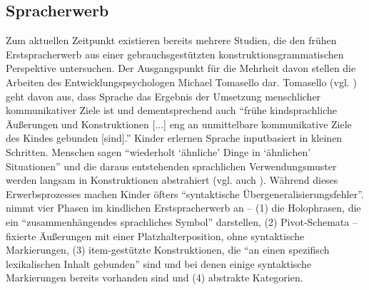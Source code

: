


\subsection{Spracherwerb}
Zum aktuellen Zeitpunkt existieren bereits mehrere Studien, die den frühen Erstspracherwerb aus einer gebrauchsgestützten konstruktionsgrammatischen Perspektive untersuchen.
Der Ausgangspunkt für die Mehrheit davon stellen die Arbeiten des Entwicklungspsychologen Michael Tomasello dar.
Tomasello (vgl. \cite{Tomasello06}) geht davon aus, dass Sprache das Ergebnis der Umsetzung menschlicher kommunikativer Ziele ist
und dementsprechend auch ``frühe kindsprachliche Äußerungen und Konstruktionen [...] eng an unmittelbare kommunikative Ziele des Kindes gebunden [sind].''
Kinder erlernen Sprache inputbasiert in kleinen Schritten.
Menschen sagen ``wiederholt `ähnliche' Dinge in `ähnlichen' Situationen'' \cite{Tomasello06} und die daraus entstehenden sprachlichen Verwendungsmuster werden langsam in Konstruktionen abstrahiert (vgl. auch \cite{Ellis08}).
Während dieses Erwerbsprozesses machen Kinder öfters ``syntaktische Übergeneralisierungsfehler''.%
\cite{Tomasello06} nimmt vier Phasen im kindlichen Erstspracherwerb an --
(1) die Holophrasen, die ein ``zusammenhängendes sprachliches Symbol'' darstellen,
(2) Pivot-Schemata -- fixierte Äußerungen mit einer Platzhalterposition, ohne syntaktische Markierungen,
(3) item-gestützte Konstruktionen, die ``an einen spezifisch lexikalischen Inhalt gebunden'' sind und bei denen einige syntaktische Markierungen bereits vorhanden sind
und (4) abstrakte Kategorien.



